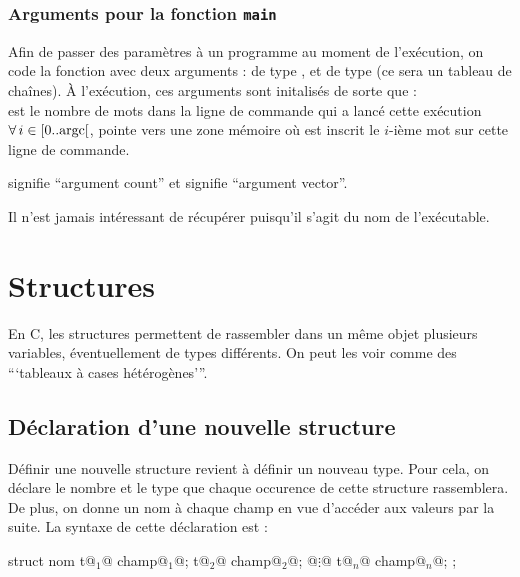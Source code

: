 		\subsubsection{Arguments pour la fonction \texttt{main}}
		
			Afin de passer des paramètres à un programme au moment de l'exécution, on code la fonction  avec deux arguments :  de type , et  de type  (ce sera un tableau de chaînes). \nt
			\`A l'exécution, ces arguments sont initalisés de sorte que : \\
				 \bdot {} est le nombre de mots dans la ligne de commande qui a lancé cette exécution \\
				 \bdot \(\forall\,i\in[0..\rm{argc}[\),  pointe vers une zone mémoire où est inscrit le \(i\)-ième mot sur cette \\  \listspace ligne de commande.
			
			\begin{Remarque}
				 signifie ``argument count'' et  signifie ``argument vector''.
			\end{Remarque}
		
			\vs{2}
			\begin{Remarque}
				Il n'est jamais intéressant de récupérer  puisqu'il s'agit du nom de l'exécutable.
			\end{Remarque}
		
\section{Structures}

	En C, les structures permettent de rassembler dans un même objet plusieurs variables, éventuellement de types différents. On peut les voir comme des ```tableaux à cases hétérogènes'''.
	
	\subsection{Déclaration d'une nouvelle structure}
	
		Définir une nouvelle structure revient à définir un nouveau type. Pour cela, on déclare le nombre et le type que chaque occurence de cette structure rassemblera. De plus, on donne un nom à chaque champ en vue d'accéder aux valeurs par la suite. \nt
		La syntaxe de cette déclaration est :
			\begin{C}
								struct nom{
									t@$_1$@ champ@$_1$@;
									t@$_2$@ champ@$_2$@;
									     @$\vdots$@
									t@$_n$@ champ@$_n$@;
								};
									
			\end{C}
		
